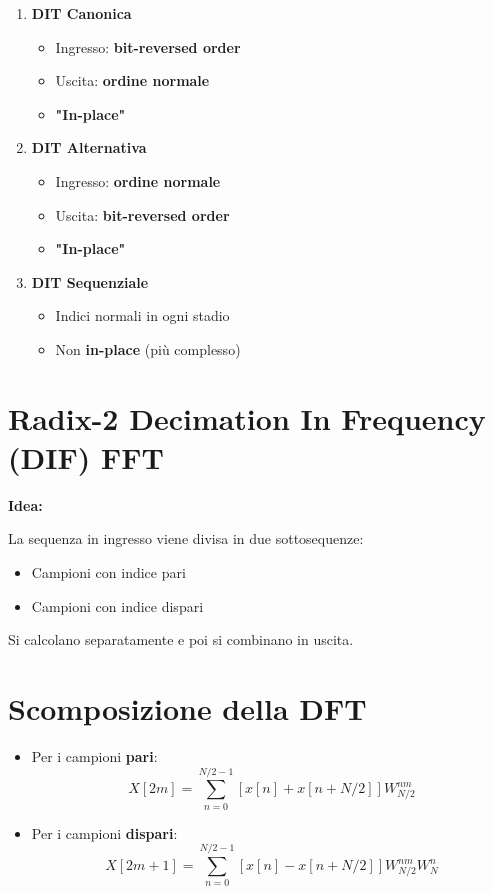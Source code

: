 \begin{enumerate}
    \item \textbf{DIT Canonica}
    \begin{itemize}
        \item Ingresso: \textbf{bit-reversed order}
        \item Uscita: \textbf{ordine normale}
        \item \textbf{"In-place"}
    \end{itemize}
    \item \textbf{DIT Alternativa}
    \begin{itemize}
        \item Ingresso: \textbf{ordine normale}
        \item Uscita: \textbf{bit-reversed order}
        \item \textbf{"In-place"}
    \end{itemize}
    \item \textbf{DIT Sequenziale}
    \begin{itemize}
        \item Indici normali in ogni stadio
        \item Non \textbf{in-place} (più complesso)
    \end{itemize}
\end{enumerate}

\section*{Radix-2 Decimation In Frequency (DIF) FFT}

\textbf{Idea:}

La sequenza in ingresso viene divisa in due sottosequenze:
\begin{itemize}
    \item Campioni con indice pari
    \item Campioni con indice dispari
\end{itemize}

Si calcolano separatamente e poi si combinano in uscita.

\section*{Scomposizione della DFT}

\begin{itemize}
    \item Per i campioni \textbf{pari}:
    \[
    X[2m] = \sum_{n=0}^{N/2-1} \left[ x[n] + x[n+N/2] \right] W_{N/2}^{nm}
    \]
    \item Per i campioni \textbf{dispari}:
    \[
    X[2m+1] = \sum_{n=0}^{N/2-1} \left[ x[n] - x[n+N/2] \right] W_{N/2}^{nm} W_N^n
    \]
\end{itemize}

